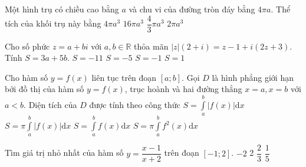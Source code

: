 \begin{ex}%
 Một hình trụ có chiều cao bằng $a$ và chu vi của đường tròn đáy bằng $4\pi a$. Thể tích của khối trụ này bằng
\choice
{\True $4\pi {a}^{3}$}
{$16\pi {a}^{3}$}
{$\dfrac{4}{3}\pi {a}^{3}$}
{$2\pi {a}^{3}$}
\end{ex}
\begin{ex}%
 Cho số phức $z=a+bi$ với $a, b\in\mathbb{R}$ thỏa mãn $|z|(2+i)=z-1+i(2z+3)$. Tính $S=3a+5b$.
\choice
{\True $S=-11$}
{$S=-5$}
{$S=-1$}
{$S=1$}
\end{ex}
\begin{ex}%
 Cho hàm số $y=f(x)$ liên tục trên đoạn $[a; b]$. Gọi $D$ là hình phẳng giới hạn bởi đồ thị của hàm số $y=f(x)$, trục hoành và hai đường thẳng $x=a, x=b$ với $a<b$. Diện tích của $D$ được tính theo công thức
\choice
{\True $S=\displaystyle\int\limits_a^b\left|f(x)\right|\mathrm{d}x$}
{$S=\pi\displaystyle\int\limits_a^b\left|f(x)\right|\mathrm{d}x$}
{$S=\displaystyle\int\limits_a^bf(x)\mathrm{d}x$}
{$S=\pi\displaystyle\int\limits_a^bf^2(x)\mathrm{d}x$}
\end{ex}
\begin{ex}%
 Tìm giá trị nhỏ nhất của hàm số $y=\dfrac{x-1}{x+2}$ trên đoạn $\left[-1;2\right]$.
\choice
{\True $-2$}
{2	}
{$\dfrac{2}{3}$}
{$\dfrac{1}{5}$}
\end{ex}
